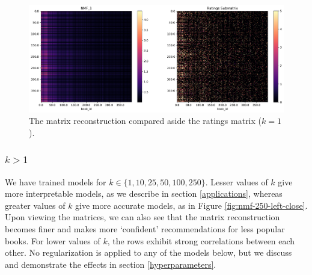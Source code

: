 \documentclass[11pt]{article}
\begin{document}
\begin{figure}
    \includegraphics[width=\linewidth]{../image/goodreads-models/nmf-1-left.png}
    \caption[NMF-1]{The matrix reconstruction compared aside the ratings matrix ($k=1$).}
     \label{fig:nmf-1}
\end{figure}









    \hypertarget{k>1}{%
\subsubsection{\texorpdfstring{\(k > 1\)}{k > 1}}\label{k>1}}

%

We have trained models for $k \in \{1, 10, 25, 50, 100, 250\}$. Lesser values of \(k\) give more
interpretable models, as we describe in section \ref{applications}, whereas greater values of \(k\) give more accurate
models, as in Figure \ref{fig:nmf-250-left-close}.
Upon viewing the matrices, we can also see that the matrix reconstruction becomes
finer and makes more `confident' recommendations for less popular books.
For lower values of $k$, the rows exhibit strong correlations between each other.
No regularization is applied to any of the models below, but we discuss and demonstrate the effects in section \ref{hyperparameters}.
\end{document}
